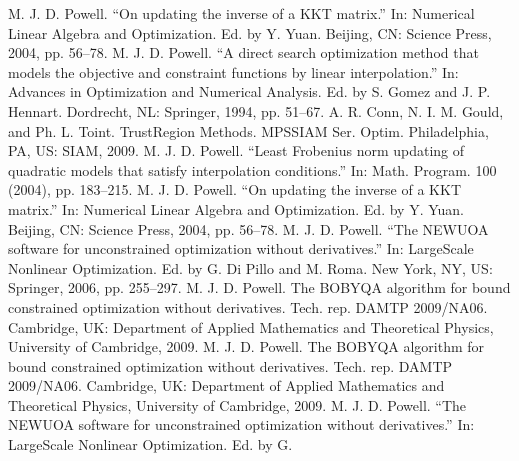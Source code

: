 \documentclass[letterpaper,10pt,english]{sphinxmanual}
\begin{document}
\begin{sphinxthebibliography}{1}
\sphinxAtStartPar
M. J. D. Powell. “On updating the inverse of a KKT matrix.” In:
Numerical Linear Algebra and Optimization. Ed. by Y. Yuan. Beijing,
CN: Science Press, 2004, pp. 56–78.
\sphinxAtStartPar
M. J. D. Powell. “A direct search optimization method that models
the objective and constraint functions by linear interpolation.” In:
Advances in Optimization and Numerical Analysis. Ed. by S. Gomez and
J. P. Hennart. Dordrecht, NL: Springer, 1994, pp. 51–67.
\sphinxAtStartPar
A. R. Conn, N. I. M. Gould, and Ph. L. Toint. Trust\sphinxhyphen{}Region
Methods. MPS\sphinxhyphen{}SIAM Ser. Optim. Philadelphia, PA, US: SIAM, 2009.
\sphinxAtStartPar
M. J. D. Powell. “Least Frobenius norm updating of quadratic models
that satisfy interpolation conditions.” In: Math. Program. 100 (2004),
pp. 183–215.
\sphinxAtStartPar
M. J. D. Powell. “On updating the inverse of a KKT matrix.” In:
Numerical Linear Algebra and Optimization. Ed. by Y. Yuan. Beijing,
CN: Science Press, 2004, pp. 56–78.
\sphinxAtStartPar
M. J. D. Powell. “The NEWUOA software for unconstrained optimization
without derivatives.” In: Large\sphinxhyphen{}Scale Nonlinear Optimization. Ed. by G.
Di Pillo and M. Roma. New York, NY, US: Springer, 2006, pp. 255–297.
\sphinxAtStartPar
M. J. D. Powell. The BOBYQA algorithm for bound constrained
optimization without derivatives. Tech. rep. DAMTP 2009/NA06. Cambridge,
UK: Department of Applied Mathematics and Theoretical Physics, University
of Cambridge, 2009.
\sphinxAtStartPar
M. J. D. Powell. The BOBYQA algorithm for bound constrained
optimization without derivatives. Tech. rep. DAMTP 2009/NA06. Cambridge,
UK: Department of Applied Mathematics and Theoretical Physics, University
of Cambridge, 2009.
\sphinxAtStartPar
M. J. D. Powell. “The NEWUOA software for unconstrained optimization
without derivatives.” In: Large\sphinxhyphen{}Scale Nonlinear Optimization. Ed. by G.

\end{sphinxthebibliography}
\end{document}
